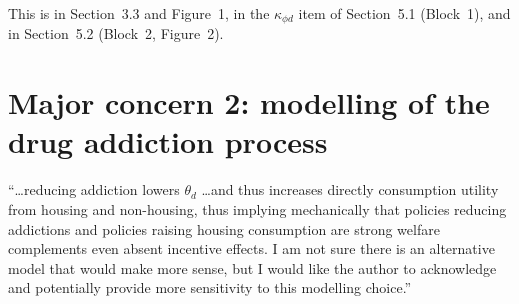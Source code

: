 \documentclass[11pt]{article}
\begin{document}
\begin{response}
This is in Section~3.3 and Figure~1, in the $\kappa_{\phi d}$ item of Section~5.1
(Block~1), and in Section~5.2 (Block~2, Figure~2).
\end{response}

\section*{Major concern 2: modelling of the drug addiction process}

\begin{referee}
``\dots reducing addiction lowers $\theta_d$ \dots and thus increases directly
consumption utility from housing and non-housing, thus implying mechanically that
policies reducing addictions and policies raising housing consumption are strong
welfare complements even absent incentive effects. I am not sure there is an
alternative model that would make more sense, but I would like the author to
acknowledge and potentially provide more sensitivity to this modelling choice.''
\end{referee}
\end{document}
